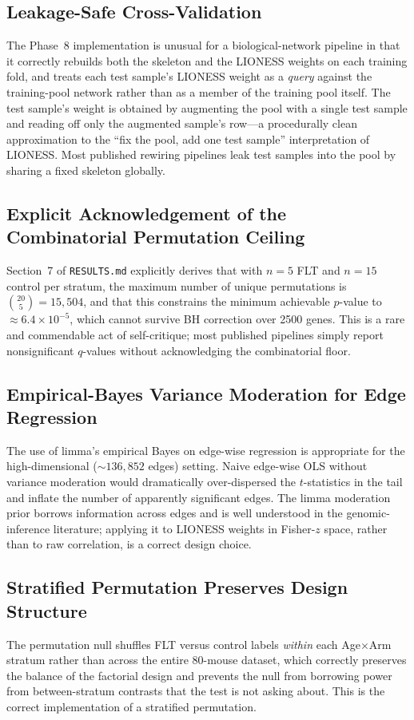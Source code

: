 \documentclass[11pt]{article}
\newcommand{\code}[1]{\texttt{#1}}
\begin{document}
\subsection{Leakage-Safe Cross-Validation}
The Phase~8 implementation is unusual for a biological-network pipeline in that it correctly rebuilds both the skeleton and the LIONESS weights on each training fold, and treats each test sample's LIONESS weight as a \emph{query} against the training-pool network rather than as a member of the training pool itself. The test sample's weight is obtained by augmenting the pool with a single test sample and reading off only the augmented sample's row---a procedurally clean approximation to the ``fix the pool, add one test sample'' interpretation of LIONESS. Most published rewiring pipelines leak test samples into the pool by sharing a fixed skeleton globally.

\subsection{Explicit Acknowledgement of the Combinatorial Permutation Ceiling}
Section~7 of \code{RESULTS.md} explicitly derives that with $n{=}5$ FLT and $n{=}15$ control per stratum, the maximum number of unique permutations is $\binom{20}{5} = 15{,}504$, and that this constrains the minimum achievable $p$-value to $\approx 6.4 \times 10^{-5}$, which cannot survive BH correction over 2500 genes. This is a rare and commendable act of self-critique; most published pipelines simply report nonsignificant $q$-values without acknowledging the combinatorial floor.

\subsection{Empirical-Bayes Variance Moderation for Edge Regression}
The use of limma's empirical Bayes on edge-wise regression is appropriate for the high-dimensional ($\sim 136{,}852$ edges) setting. Naive edge-wise OLS without variance moderation would dramatically over-dispersed the $t$-statistics in the tail and inflate the number of apparently significant edges. The limma moderation prior borrows information across edges and is well understood in the genomic-inference literature; applying it to LIONESS weights in Fisher-$z$ space, rather than to raw correlation, is a correct design choice.

\subsection{Stratified Permutation Preserves Design Structure}
The permutation null shuffles FLT versus control labels \emph{within} each Age$\times$Arm stratum rather than across the entire 80-mouse dataset, which correctly preserves the balance of the factorial design and prevents the null from borrowing power from between-stratum contrasts that the test is not asking about. This is the correct implementation of a stratified permutation.
\end{document}
